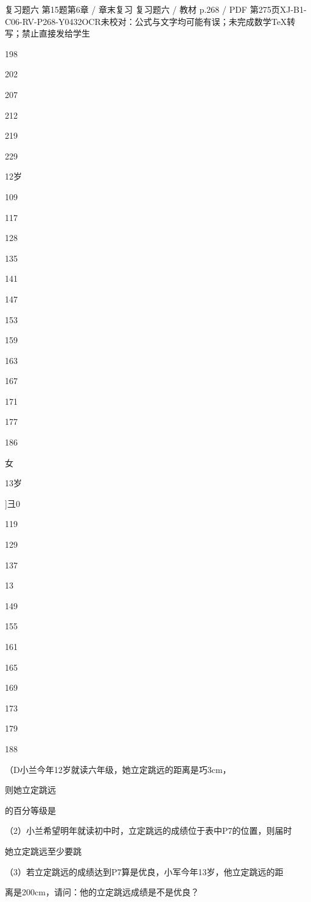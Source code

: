 \begin{bankitem}{复习题六 第15题}{第6章 / 章末复习 复习题六 / 教材 p.268 / PDF 第275页}{XJ-B1-C06-RV-P268-Y0432}{OCR未校对：公式与文字均可能有误；未完成数学TeX转写；禁止直接发给学生}
\begin{ocrdraft}
198
\par
202
\par
207
\par
212
\par
219
\par
229
\par
12岁
\par
109
\par
117
\par
128
\par
135
\par
141
\par
147
\par
153
\par
159
\par
163
\par
167
\par
171
\par
177
\par
186
\par
女
\par
13岁
\par
]彐0
\par
119
\par
129
\par
137
\par
13
\par
149
\par
155
\par
161
\par
165
\par
169
\par
173
\par
179
\par
188
\par
（D小兰今年12岁就读六年级，她立定跳远的距离是巧3cm，
\par
则她立定跳远
\par
的百分等级是
\par
（2）小兰希望明年就读初中时，立定跳远的成绩位于表中P7的位置，则届时
\par
她立定跳远至少要跳
\par
（3）若立定跳远的成绩达到P7算是优良，小军今年13岁，他立定跳远的距
\par
离是200cm，请问：他的立定跳远成绩是不是优良？
\end{ocrdraft}
\end{bankitem}
